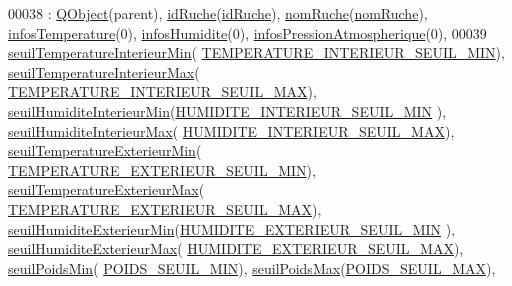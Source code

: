 \begin{DoxyCode}
00038                                                                    : \hyperlink{class_q_object}{QObject}(parent), 
      \hyperlink{class_alertes_ae3f9d7aa34ab3c83a66c8484e2b89925}{idRuche}(\hyperlink{class_alertes_ae3f9d7aa34ab3c83a66c8484e2b89925}{idRuche}), \hyperlink{class_alertes_a212f2a7185bcc7b11f3e54200272bdcf}{nomRuche}(\hyperlink{class_alertes_a212f2a7185bcc7b11f3e54200272bdcf}{nomRuche}), 
      \hyperlink{class_alertes_ad02b203545812ad6408befecc94ee0ec}{infosTemperature}(0), \hyperlink{class_alertes_a7b6d798ca0629b474120cd55eb8b510c}{infosHumidite}(0), 
      \hyperlink{class_alertes_af4bfb245d72bc2eb080df844aa50ac86}{infosPressionAtmospherique}(0),
00039     \hyperlink{class_alertes_a1c970252300a177bef641ca5399d3783}{seuilTemperatureInterieurMin}(
      \hyperlink{parametres_8h_a1f78dd3105c514060033c23f7b40a899}{TEMPERATURE\_INTERIEUR\_SEUIL\_MIN}), 
      \hyperlink{class_alertes_abeda87298576a3b3eefcca9a96b8a0a9}{seuilTemperatureInterieurMax}(
      \hyperlink{parametres_8h_a76f490066655530a774202e6204f2a92}{TEMPERATURE\_INTERIEUR\_SEUIL\_MAX}), 
      \hyperlink{class_alertes_a501773587c8f2ccd032fe7db9af1f4e2}{seuilHumiditeInterieurMin}(\hyperlink{parametres_8h_a123e6e1d82333f6e038d37ef506d5762}{HUMIDITE\_INTERIEUR\_SEUIL\_MIN}
      ), \hyperlink{class_alertes_a795cd3721854335f6c91e6009b324c37}{seuilHumiditeInterieurMax}(
      \hyperlink{parametres_8h_afc1996946dfec64accdaa88f4e313058}{HUMIDITE\_INTERIEUR\_SEUIL\_MAX}), 
      \hyperlink{class_alertes_a0898c501edf5f07ac503b31b8a3d2454}{seuilTemperatureExterieurMin}(
      \hyperlink{parametres_8h_aeb90c8fd31e6aa6473edd143ce70e137}{TEMPERATURE\_EXTERIEUR\_SEUIL\_MIN}), 
      \hyperlink{class_alertes_a207e0266c68ad378dae846382ba9f9dc}{seuilTemperatureExterieurMax}(
      \hyperlink{parametres_8h_a7630cd07e0f037b4057157febd9644fd}{TEMPERATURE\_EXTERIEUR\_SEUIL\_MAX}), 
      \hyperlink{class_alertes_a18afbc02513a6e4fa8baa665092719c9}{seuilHumiditeExterieurMin}(\hyperlink{parametres_8h_afc00f65688c19bd56711c244827c2c27}{HUMIDITE\_EXTERIEUR\_SEUIL\_MIN}
      ), \hyperlink{class_alertes_afa54793d1f47a97894faf91e76fb2a04}{seuilHumiditeExterieurMax}(
      \hyperlink{parametres_8h_a25f8411ff3fd72788fdcd7487e7e8d28}{HUMIDITE\_EXTERIEUR\_SEUIL\_MAX}), \hyperlink{class_alertes_a3f23bee8122888916e33559f4d0bf34b}{seuilPoidsMin}(
      \hyperlink{parametres_8h_a289e59d08fbd111c6a5bd8a526a8098b}{POIDS\_SEUIL\_MIN}), \hyperlink{class_alertes_a19b88c68325ccc6e5e8ad11a2537b25e}{seuilPoidsMax}(\hyperlink{parametres_8h_a41d2727214068bc11cea2e021fb6b237}{POIDS\_SEUIL\_MAX}), 

\end{DoxyCode}

